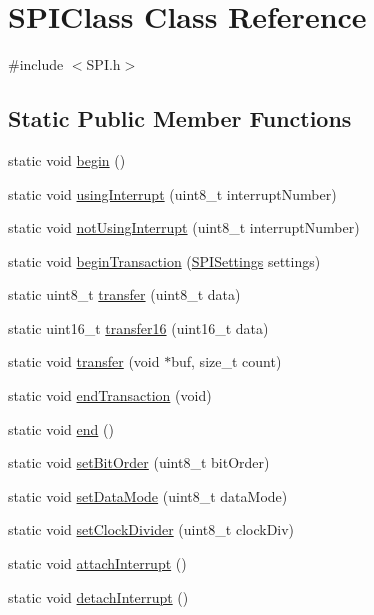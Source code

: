 \hypertarget{class_s_p_i_class}{}\section{S\+P\+I\+Class Class Reference}
\label{class_s_p_i_class}


{\ttfamily \#include $<$S\+P\+I.\+h$>$}

\subsection*{Static Public Member Functions}
\begin{DoxyCompactItemize}
\item 
static void \hyperlink{class_s_p_i_class_a4a2646959a242f6af423b04734c003f0}{begin} ()
\item 
static void \hyperlink{class_s_p_i_class_a1f21d6f84d89334bf1a897ec116860b4}{using\+Interrupt} (uint8\+\_\+t interrupt\+Number)
\item 
static void \hyperlink{class_s_p_i_class_a7d1e15e5d075ee08c3aa006fab78f637}{not\+Using\+Interrupt} (uint8\+\_\+t interrupt\+Number)
\item 
static void \hyperlink{class_s_p_i_class_ae1cf818a1add8237a1f6ead0cb20943a}{begin\+Transaction} (\hyperlink{class_s_p_i_settings}{S\+P\+I\+Settings} settings)
\item 
static uint8\+\_\+t \hyperlink{class_s_p_i_class_a4f716aa6f751ca1e6213c7229a3b2a73}{transfer} (uint8\+\_\+t data)
\item 
static uint16\+\_\+t \hyperlink{class_s_p_i_class_addd97e6ac969a2a45252be988e81e717}{transfer16} (uint16\+\_\+t data)
\item 
static void \hyperlink{class_s_p_i_class_a32756da6a1149ceb787abeea4edc7b1f}{transfer} (void $\ast$buf, size\+\_\+t count)
\item 
static void \hyperlink{class_s_p_i_class_a99054797d8478c8fe0cdee943e00614e}{end\+Transaction} (void)
\item 
static void \hyperlink{class_s_p_i_class_a79d89d8e3f5f1b003cb7b0aed2d77eab}{end} ()
\item 
static void \hyperlink{class_s_p_i_class_a89d65229b73a3e5d846c9b538e988f97}{set\+Bit\+Order} (uint8\+\_\+t bit\+Order)
\item 
static void \hyperlink{class_s_p_i_class_adc36dd3465da6f3c7cfc05c08c066b38}{set\+Data\+Mode} (uint8\+\_\+t data\+Mode)
\item 
static void \hyperlink{class_s_p_i_class_a472cba5159ed3f74b2a43a4cc3781824}{set\+Clock\+Divider} (uint8\+\_\+t clock\+Div)
\item 
static void \hyperlink{class_s_p_i_class_afbdbcf7f1360c567aabd7afa8905fb69}{attach\+Interrupt} ()
\item 
static void \hyperlink{class_s_p_i_class_a4a5eec76f907eef2b8d40fc4a3032327}{detach\+Interrupt} ()
\end{DoxyCompactItemize}


